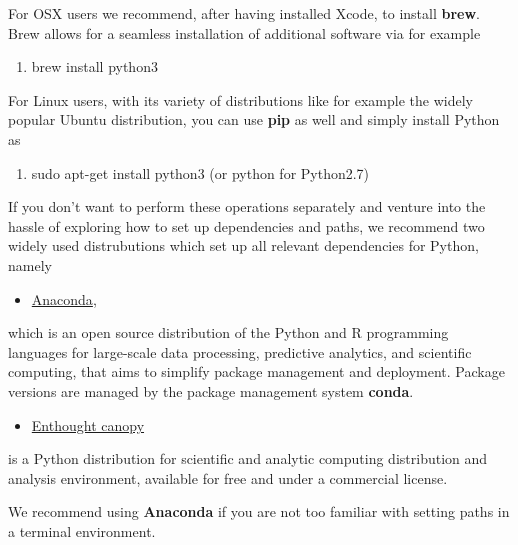 \documentclass{beamer}
\newenvironment{doconceexercise}{}{}
\newcounter{doconceexercisecounter}
\newcounter{doconce:movie:counter}
\begin{document}
\begin{frame}
\begin{doconceexercise}
For OSX users we recommend, after having installed Xcode, to
install \textbf{brew}. Brew allows for a seamless installation of additional
software via for example 

\begin{enumerate}
\item brew install python3
\end{enumerate}

\noindent
For Linux users, with its variety of distributions like for example the widely popular Ubuntu distribution,
you can use \textbf{pip} as well and simply install Python as 

\begin{enumerate}
\item sudo apt-get install python3  (or python for Python2.7)
\end{enumerate}

\noindent
If you don't want to perform these operations separately and venture
into the hassle of exploring how to set up dependencies and paths, we
recommend two widely used distrubutions which set up all relevant
dependencies for Python, namely 

\begin{itemize}
\item \href{{https://docs.anaconda.com/}}{Anaconda}, 
\end{itemize}

\noindent
which is an open source
distribution of the Python and R programming languages for large-scale
data processing, predictive analytics, and scientific computing, that
aims to simplify package management and deployment. Package versions
are managed by the package management system \textbf{conda}. 

\begin{itemize}
\item \href{{https://www.enthought.com/product/canopy/}}{Enthought canopy} 
\end{itemize}

\noindent
is a Python
distribution for scientific and analytic computing distribution and
analysis environment, available for free and under a commercial
license.

We recommend using \textbf{Anaconda} if you are not too familiar with setting paths in a terminal environment.

\end{doconceexercise}

\begin{doconceexercise}


\end{doconceexercise}
\end{frame}
\end{document}
